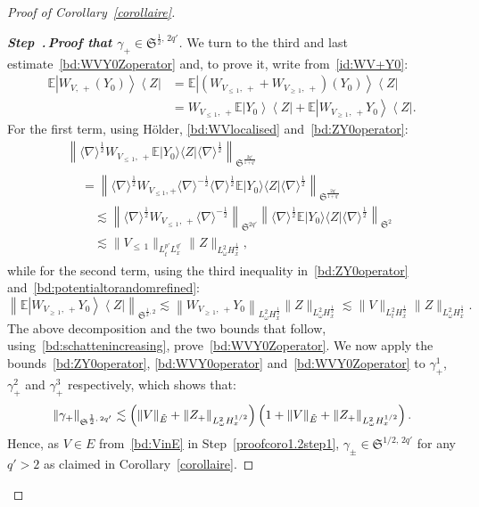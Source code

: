 \documentclass[10pt]{amsart}
\theoremstyle{definition}\newtheorem{defi}[theo]{Definition}\newtheorem{rema}[theo]{Remark}\newtheorem{exam}[theo]{Example}\newtheorem{exem}[theo]{Example}\newtheorem{nota}[theo]{Notation}
\newcommand{\E}{\mathbb{E}}
\newcommand{\frkS}{\mathfrak{S}}
\newcounter{stepcount}
\newenvironment{step}[1]{\refstepcounter{stepcount}\begin{proof}[{\bf{Step~\thestepcount}{.\,\emph{#1}}}]}{\let\qed\relax\end{proof}}
\let\oldtilde\tilde
\renewcommand*{\tilde}[1]{\mathchoice{\widetilde{#1}}{\widetilde{#1}}{\oldtilde{#1}}{\oldtilde{#1}}}
\begin{document}
\begin{proof}[Proof of Corollary~\ref{corollaire}]
\begin{step}{{Proof that $\gamma_+\in \frkS^{\frac 12,\,2q'}$}}
We turn to the third and last estimate~\eqref{bd:WVY0Zoperator} and, to prove it, write from~\eqref{id:WV+Y0}:
\begin{align*}
\E \left|W_{V,\,+}(Y_0)\right\rangle \left\langle Z \right|&=\E\left|\left(W_{V_{\leq\,1},\,+}+W_{V_{\geq\,1},\,+}\right)(Y_0)\right\rangle \left\langle Z\right|\\
&=W_{V_{\leq\,1},\,+} \E\left|Y_0\right\rangle \left\langle Z \right|+\E \left|W_{V_{\geq\,1},\,+}Y_0\right\rangle \left\langle Z \right|.
\end{align*}
For the first term, using H\"older, \eqref{bd:WVlocalised} and~\eqref{bd:ZY0operator}:
\begin{multline*}
\left\| \langle \nabla \rangle^{\frac 12} W_{V_{\leq\, 1},\,+} \E|Y_0\rangle \langle Z |\langle \nabla \rangle^{\frac 12} \right\|_{\frkS^{\frac{2q'}{1+q'}}}
\\
\begin{aligned}
&= \left\| \langle \nabla \rangle^{\frac 12} W_{V_{\leq 1},+} \langle \nabla \rangle^{-\frac 12}\langle \nabla \rangle^{\frac 12} \E|Y_0\rangle \langle Z |\langle \nabla \rangle^{\frac 12} \right\|_{\frkS^{\frac{2q'}{1+q'}}} \\
&\quad\lesssim \left\| \langle \nabla \rangle^{\frac 12} W_{V_{\leq\,1},\,+} \langle \nabla \rangle^{-\frac 12}\right\|_{\frkS^{2q'}} \left\| \langle \nabla \rangle^{\frac 12} \E|Y_0\rangle \langle Z |\langle \nabla \rangle^{\frac 12} \right\|_{\frkS^{2}}\\
&\quad\lesssim \| V_{\leq\,1}\|_{L^{p'}_tL^{q'}_x} \| Z\|_{L^2_\omega H^{\frac 12}_x},
\end{aligned}
\end{multline*}
while for the second term, using the third inequality in~\eqref{bd:ZY0operator} and~\eqref{bd:potentialtorandomrefined}:
\[
\left\| \E \left|W_{V_{\geq\,1},\,+}Y_0\right\rangle \left\langle Z \right|\right\|_{\frkS^{\frac 12,2}} \lesssim \left\| W_{V_{\geq\,1},\,+}Y_0\right\|_{L^2_\omega H^{\frac 12}_x} \| Z \|_{L^2_\omega H^{\frac 12}_x}\lesssim \| V\|_{L^2_tH^{\frac12}_x} \| Z \|_{L^2_\omega H^{\frac 12}_x}.
\]
The above decomposition and the two bounds that follow, using~\eqref{bd:schattenincreasing}, prove~\eqref{bd:WVY0Zoperator}. We now apply the bounds~\eqref{bd:ZY0operator}, \eqref{bd:WVY0operator} and~\eqref{bd:WVY0Zoperator} to $\gamma_+^1$, $\gamma_+^2$ and $\gamma_+^3$ respectively, which shows that:
\[
\left\| \gamma_+\right\|_{\frkS^{\frac 12,\,2q'}}\lesssim \left(\| V\|_{\tilde E}+\left\| Z_+ \right\|_{L^2_\omega H^{1/2}_x} \right)\left(1+\| V\|_{\tilde E}+\left\| Z_+ \right\|_{L^2_\omega H^{1/2}_x}\right).
\]
Hence, as $V\in E$ from~\eqref{bd:VinE} in Step~\ref{proofcoro1.2step1}, $\gamma_\pm \in \frkS^{1/2,\,2q'}$ for any $q'>2$ as claimed in Corollary~\ref{corollaire}.
\end{step}


\end{proof}
\end{document}

